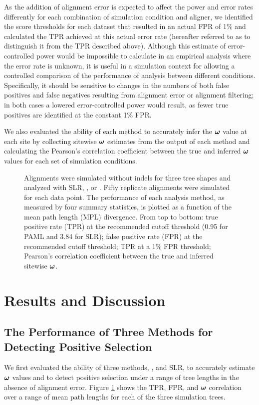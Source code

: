 \documentclass{article}
\begin{document}
As the addition of alignment error is expected to affect the power and
error rates differently for each combination of simulation condition
and aligner, we identified the score thresholds for each dataset that
resulted in an actual FPR of 1\% and calculated the TPR achieved at
this actual error rate (hereafter referred to as \tpr{} to distinguish
it from the TPR described above). Although this estimate of
error-controlled power would be impossible to calculate in an
empirical analysis where the error rate is unknown, it is useful in a
simulation context for allowing a controlled comparison of the
performance of \sw analysis between different
conditions. Specifically, it should be sensitive to changes in the
numbers of both false positives and false negatives resulting from
alignment error or alignment filtering; in both cases a lowered
error-controlled power would result, as fewer true positives are
identified at the constant 1\% FPR.

We also evaluated the ability of each method to accurately infer the
$\bm{\omega}$ value at each site by collecting sitewise $\bm{\omega}$ estimates from
the output of each method and calculating the Pearson's correlation
coefficient between the true and inferred $\bm{\omega}$ values for each set
of simulation conditions.

\begin{figure}[t]
\begin{center}
\end{center}
\caption{Alignments were simulated without indels for three tree
  shapes and analyzed with SLR, \meight, or \mtwo. Fifty replicate
  alignments were simulated for each data point. The performance of
  each analysis method, as measured by four summary statistics, is
  plotted as a function of the mean path length (MPL) divergence. From
  top to bottom: true positive rate (TPR) at the recommended cutoff
  threshold (0.95 for PAML and 3.84 for SLR); false positive rate
  (FPR) at the recommended cutoff threshold; TPR at a 1\% FPR
  threshold; Pearson's correlation coefficient between the true and
  inferred sitewise $\bm{\omega}$.}
\label{fig_2}
\end{figure}

\section*{Results and Discussion}
\subsection*{The Performance of Three Methods for Detecting \Sw Positive Selection}
We first evaluated the ability of three \sw methods, \mtwo, \meight
and SLR, to accurately estimate \sw $\bm{\omega}$ values and to detect
positive selection under a range of tree lengths in the absence of
alignment error. Figure \ref{fig_2} shows the TPR, FPR, \tpr{} and \sw
$\bm{\omega}$ correlation over a range of mean path lengths
 for each of the three simulation trees.
\end{document}
